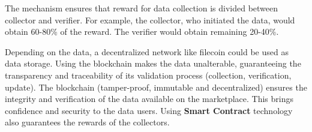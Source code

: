 The mechanism ensures that reward for data collection is divided between collector and verifier.
For example, the collector, who initiated the data, would obtain 60-80\% of the reward.
The verifier would obtain remaining 20-40\%.

Depending on the data, a decentralized network like filecoin could be used as data storage.
Using the blockchain makes the data unalterable, guaranteeing the transparency and traceability of its validation process (collection, verification, update).
The blockchain (tamper-proof, immutable and decentralized) ensures the integrity and verification of the data available on the marketplace.
This brings confidence and security to the data users.
Using \textbf{Smart Contract} technology also guarantees the rewards of the collectors.
